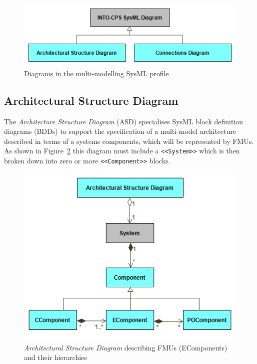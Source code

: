 \begin{figure}[h!]
\centering
\includegraphics[scale=0.6]{figures/Architecting/ArchitecturalViews}
\caption{Diagrams in the multi-modelling SysML profile}
\label{fig:sysml:intocps}
\end{figure}

\newpage
\subsection{Architectural Structure Diagram}
\label{sec:sysml:intocps:asd}

The \emph{Architecture Structure Diagram} (ASD) specialises SysML block definition diagrams (BDDs) to support the specification of a multi-model architecture described in terms of a systems components, which will be represented by FMUs. As shown in Figure~\ref{fig:sysml:sysml:intocps:ase} this diagram must include a \texttt{<<System>>} which is then broken down into zero or more \texttt{<<Component>>} blocks.

\begin{figure}[h!]
\centering
\includegraphics[scale=0.6]{figures/Architecting/ArchitecturalStructureElements}
\caption{\emph{Architectural Structure Diagram} describing FMUs (EComponents) and their hierarchies}
\label{fig:sysml:sysml:intocps:ase}
\end{figure}

